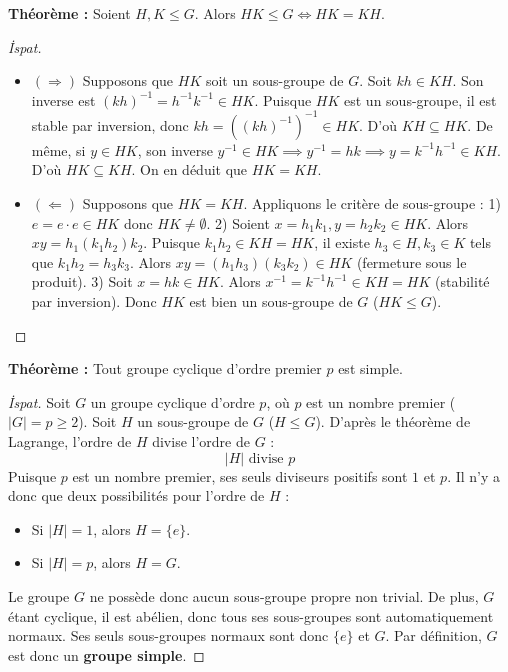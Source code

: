 \documentclass[11pt,a4paper]{article}
\begin{document}
\begin{tcolorbox}[colback=red!5!white,colframe=red!75!black,title=\textbf{İSPAT 3 : İki Alt Grubun Çarpımı ($HK \leq G \iff HK = KH$)}]
\textbf{Théorème :} Soient $H, K \leq G$. Alors $HK \leq G \iff HK = KH$.
\end{tcolorbox}
\begin{proof}[İspat]
\begin{itemize}
    \item $(\Longrightarrow)$ Supposons que $HK$ soit un sous-groupe de $G$.  
    Soit $kh \in KH$. Son inverse est $(kh)^{-1} = h^{-1}k^{-1} \in HK$.  
    Puisque $HK$ est un sous-groupe, il est stable par inversion, donc $kh = ((kh)^{-1})^{-1} \in HK$. D'où $KH \subseteq HK$.  
    De même, si $y \in HK$, son inverse $y^{-1} \in HK \implies y^{-1} = hk \implies y = k^{-1}h^{-1} \in KH$. D'où $HK \subseteq KH$.  
    On en déduit que $HK = KH$.
    
    \item $(\Longleftarrow)$ Supposons que $HK = KH$. Appliquons le critère de sous-groupe :  
    1) $e = e \cdot e \in HK$ donc $HK \neq \emptyset$.  
    2) Soient $x = h_1 k_1, y = h_2 k_2 \in HK$.  
    Alors $xy = h_1 (k_1 h_2) k_2$. Puisque $k_1 h_2 \in KH = HK$, il existe $h_3 \in H, k_3 \in K$ tels que $k_1 h_2 = h_3 k_3$.  
    Alors $xy = (h_1 h_3)(k_3 k_2) \in HK$ (fermeture sous le produit).  
    3) Soit $x = hk \in HK$. Alors $x^{-1} = k^{-1}h^{-1} \in KH = HK$ (stabilité par inversion).  
    Donc $HK$ est bien un sous-groupe de $G$ ($HK \leq G$).
\end{itemize}
\end{proof}

\vspace{0.4cm}

\begin{tcolorbox}[colback=red!5!white,colframe=red!75!black,title=\textbf{İSPAT 4 : Asal Mertebeli Devirli Grup Basittir}]
\textbf{Théorème :} Tout groupe cyclique d'ordre premier $p$ est simple.
\end{tcolorbox}
\begin{proof}[İspat]
Soit $G$ un groupe cyclique d'ordre $p$, où $p$ est un nombre premier ($|G| = p \geq 2$).  
Soit $H$ un sous-groupe de $G$ ($H \leq G$).  
D'après le théorème de Lagrange, l'ordre de $H$ divise l'ordre de $G$ :
\[ |H| \text{ divise } p \]
Puisque $p$ est un nombre premier, ses seuls diviseurs positifs sont $1$ et $p$.  
Il n'y a donc que deux possibilités pour l'ordre de $H$ :
\begin{itemize}
    \item Si $|H| = 1$, alors $H = \{e\}$.
    \item Si $|H| = p$, alors $H = G$.
\end{itemize}
Le groupe $G$ ne possède donc aucun sous-groupe propre non trivial.  
De plus, $G$ étant cyclique, il est abélien, donc tous ses sous-groupes sont automatiquement normaux.  
Ses seuls sous-groupes normaux sont donc $\{e\}$ et $G$.  
Par définition, $G$ est donc un \textbf{groupe simple}.
\end{proof}
\end{document}
